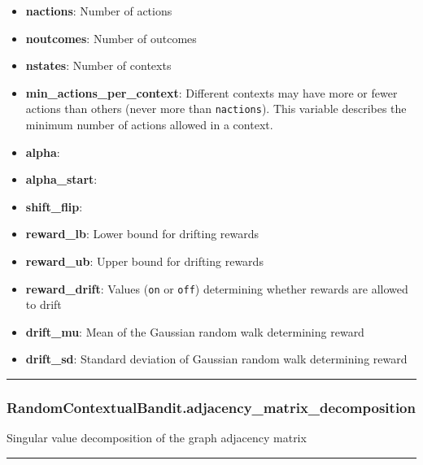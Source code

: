 \begin{itemize}
\tightlist
\item
  \textbf{nactions}: Number of actions
\item
  \textbf{noutcomes}: Number of outcomes
\item
  \textbf{nstates}: Number of contexts
\item
  \textbf{min\_actions\_per\_context}: Different contexts may have more
  or fewer actions than others (never more than \texttt{nactions}). This
  variable describes the minimum number of actions allowed in a context.
\item
  \textbf{alpha}:
\item
  \textbf{alpha\_start}:
\item
  \textbf{shift\_flip}:
\item
  \textbf{reward\_lb}: Lower bound for drifting rewards
\item
  \textbf{reward\_ub}: Upper bound for drifting rewards
\item
  \textbf{reward\_drift}: Values (\texttt{on} or \texttt{off})
  determining whether rewards are allowed to drift
\item
  \textbf{drift\_mu}: Mean of the Gaussian random walk determining
  reward
\item
  \textbf{drift\_sd}: Standard deviation of Gaussian random walk
  determining reward
\end{itemize}

\begin{center}\rule{0.5\linewidth}{\linethickness}\end{center}

\hypertarget{randomcontextualbandit.adjacency_matrix_decomposition}{%
\subsubsection{RandomContextualBandit.adjacency\_matrix\_decomposition}\label{randomcontextualbandit.adjacency_matrix_decomposition}}

\begin{Shaded}
\begin{Highlighting}[]
\NormalTok{)}
\end{Highlighting}
\end{Shaded}

Singular value decomposition of the graph adjacency matrix

\begin{center}\rule{0.5\linewidth}{\linethickness}\end{center}

